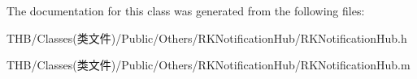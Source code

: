 The documentation for this class was generated from the following files\+:\begin{DoxyCompactItemize}
\item 
T\+H\+B/\+Classes(类文件)/\+Public/\+Others/\+R\+K\+Notification\+Hub/R\+K\+Notification\+Hub.\+h\item 
T\+H\+B/\+Classes(类文件)/\+Public/\+Others/\+R\+K\+Notification\+Hub/R\+K\+Notification\+Hub.\+m\end{DoxyCompactItemize}
